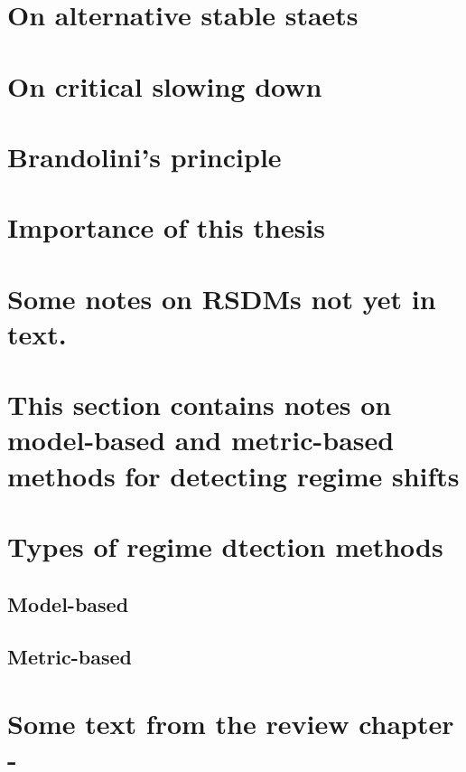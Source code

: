 \documentclass[12pt,twoside,openany]{reedthesis}
\begin{document}
\section{On alternative stable
staets}\label{on-alternative-stable-staets}

\section{On critical slowing down}\label{on-critical-slowing-down}

\section{Brandolini's principle}\label{brandolinis-principle}

\section{Importance of this thesis}\label{importance-of-this-thesis}

\section{Some notes on RSDMs not yet in
text.}\label{some-notes-on-rsdms-not-yet-in-text.}

\section{This section contains notes on model-based and metric-based
methods for detecting regime
shifts}\label{this-section-contains-notes-on-model-based-and-metric-based-methods-for-detecting-regime-shifts}

\section{Types of regime dtection
methods}\label{types-of-regime-dtection-methods}

\subsection{Model-based}\label{model-based}

\subsection{Metric-based}\label{metric-based}

\section{Some text from the review chapter
-}\label{some-text-from-the-review-chapter--}
\end{document}
